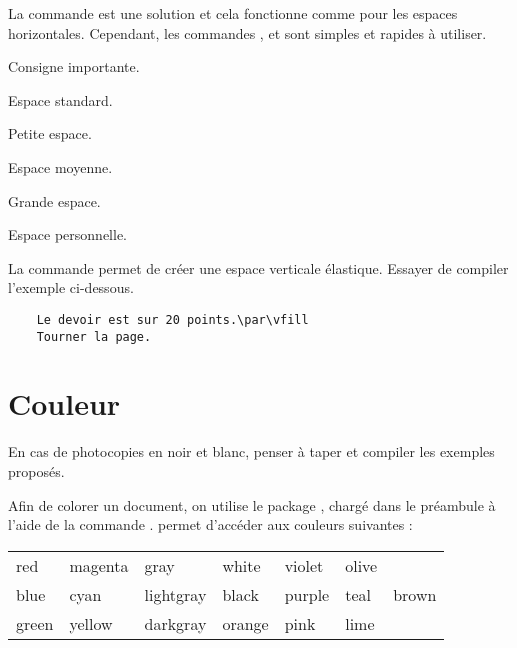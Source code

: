La commande  est une solution et cela fonctionne comme pour les espaces horizontales. Cependant, les commandes ,  et  sont simples et rapides à utiliser.\bigskip

{\NewFont
\begin{SideBySideExample}
    Consigne importante.

    Espace standard.\smallskip



    Petite espace.\medskip

    Espace moyenne.\bigskip

    Grande espace.\par\vspace{1cm}
    Espace personnelle.
\end{SideBySideExample}
\bigskip
}

\begin{info}
    La commande  permet de créer une espace verticale élastique. Essayer de compiler l'exemple ci-dessous.
\end{info}

\begin{Verbatim}
    Le devoir est sur 20 points.\par\vfill
    Tourner la page.
\end{Verbatim}

\section{Couleur}

\begin{info}
    En cas de photocopies en noir et blanc, penser à taper et compiler les exemples proposés.
\end{info}

Afin de colorer un document, on utilise le package , chargé dans le préambule à l'aide de la commande .  permet d'accéder aux couleurs suivantes :
\begin{center}
    \ttfamily
    \begin{tabular}{*{7}{l}}
        red & magenta & gray & white & violet & olive & \\
        blue & cyan  & lightgray & black & purple & teal & brown \\
        green & yellow & darkgray & orange & pink & lime &
    \end{tabular}
\end{center}

